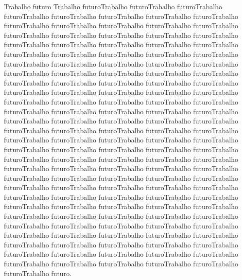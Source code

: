 Trabalho futuro Trabalho futuroTrabalho futuroTrabalho futuroTrabalho
futuroTrabalho futuroTrabalho futuroTrabalho futuroTrabalho
futuroTrabalho futuroTrabalho futuroTrabalho futuroTrabalho
futuroTrabalho futuroTrabalho futuroTrabalho futuroTrabalho
futuroTrabalho futuroTrabalho futuroTrabalho futuroTrabalho
futuroTrabalho futuroTrabalho futuroTrabalho futuroTrabalho
futuroTrabalho futuroTrabalho futuroTrabalho futuroTrabalho
futuroTrabalho futuroTrabalho futuroTrabalho futuroTrabalho
futuroTrabalho futuroTrabalho futuroTrabalho futuroTrabalho
futuroTrabalho futuroTrabalho futuroTrabalho futuroTrabalho
futuroTrabalho futuroTrabalho futuroTrabalho futuroTrabalho
futuroTrabalho futuroTrabalho futuroTrabalho futuroTrabalho
futuroTrabalho futuroTrabalho futuroTrabalho futuroTrabalho
futuroTrabalho futuroTrabalho futuroTrabalho futuroTrabalho
futuroTrabalho futuroTrabalho futuroTrabalho futuroTrabalho
futuroTrabalho futuroTrabalho futuroTrabalho futuroTrabalho
futuroTrabalho futuroTrabalho futuroTrabalho futuroTrabalho
futuroTrabalho futuroTrabalho futuroTrabalho futuroTrabalho
futuroTrabalho futuroTrabalho futuroTrabalho futuroTrabalho
futuroTrabalho futuroTrabalho futuroTrabalho futuroTrabalho
futuroTrabalho futuroTrabalho futuroTrabalho futuroTrabalho
futuroTrabalho futuroTrabalho futuroTrabalho futuroTrabalho
futuroTrabalho futuroTrabalho futuroTrabalho futuroTrabalho
futuroTrabalho futuroTrabalho futuroTrabalho futuroTrabalho
futuroTrabalho futuroTrabalho futuroTrabalho futuroTrabalho
futuroTrabalho futuroTrabalho futuroTrabalho futuroTrabalho
futuroTrabalho futuroTrabalho futuroTrabalho futuroTrabalho
futuroTrabalho futuroTrabalho futuroTrabalho futuroTrabalho
futuroTrabalho futuroTrabalho futuroTrabalho futuroTrabalho
futuroTrabalho futuroTrabalho futuroTrabalho futuroTrabalho
futuroTrabalho futuroTrabalho futuroTrabalho futuroTrabalho
futuroTrabalho futuroTrabalho futuroTrabalho futuroTrabalho
futuroTrabalho futuroTrabalho futuroTrabalho futuroTrabalho
futuroTrabalho futuroTrabalho futuroTrabalho futuroTrabalho
futuroTrabalho futuroTrabalho futuroTrabalho futuroTrabalho futuro.
